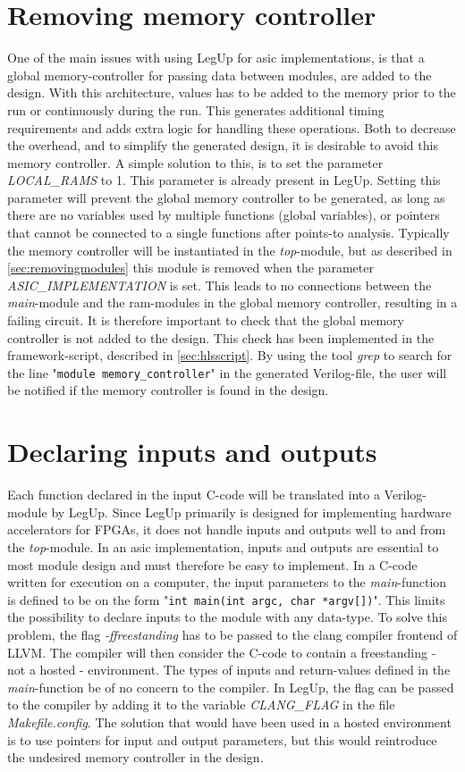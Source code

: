 \section{Removing memory controller}
One of the main issues with using LegUp for \gls{asic} implementations, is that a global memory-controller for passing data between modules, are added to the design. With this architecture, values has to be added to the memory prior to the run or continuously during the run. This generates additional timing requirements and adds extra logic for handling these operations. Both to decrease the overhead, and to simplify the generated design, it is desirable to avoid this memory controller. A simple solution to this, is to set the parameter \textit{LOCAL\_RAMS} to 1. This parameter is already present in LegUp. Setting this parameter will prevent the global memory controller to be generated, as long as there are no variables used by multiple functions (global variables), or pointers that cannot be connected to a single functions after points-to analysis. Typically the memory controller will be instantiated in the \textit{top}-module, but as described in \cref{sec:removingmodules} this module is removed when the parameter \textit{ASIC\_IMPLEMENTATION} is set. This leads to no connections between the \textit{main}-module and the \gls{ram}-modules in the global memory controller, resulting in a failing circuit. It is therefore important to check that the global memory controller is not added to the design. This check has been implemented in the framework-script, described in \cref{sec:hlsscript}. By using the tool \textit{grep} to search for the line "\verb!module memory_controller!" in the generated Verilog-file, the user will be notified if the memory controller is found in the design.

\section{\label{subsec:inoutdecl}Declaring inputs and outputs}
Each function declared in the input C-code will be translated into a Verilog-module by LegUp. Since LegUp primarily is designed for implementing hardware accelerators for FPGAs, it does not handle inputs and outputs well to and from the \textit{top}-module. In an \gls{asic} implementation, inputs and outputs are essential to most module design and must therefore be easy to implement. In a C-code written for execution on a computer, the input parameters to the \textit{main}-function is defined to be on the form "\verb!int main(int argc, char *argv[])!". This limits the possibility to declare inputs to the module with any data-type. To solve this problem, the flag \textit{-ffreestanding} has to be passed to the clang compiler frontend of LLVM. The compiler will then consider the C-code to contain a freestanding - not a hosted - environment. The types of inputs and return-values defined in the \textit{main}-function be of no concern to the compiler. In LegUp, the flag can be passed to the compiler by adding it to the variable \textit{CLANG\_FLAG} in the file \textit{Makefile.config}. The solution that would have been used in a hosted environment is to use pointers for input and output parameters, but this would reintroduce the undesired memory controller in the design.

